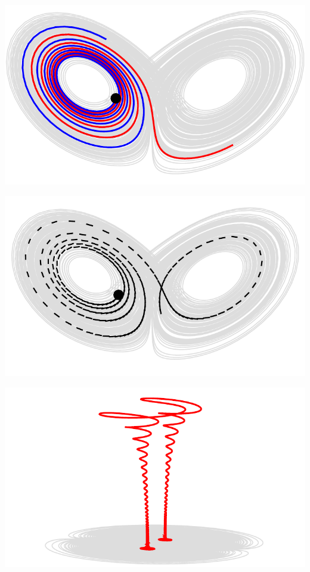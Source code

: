 \topline
\begin{center}
  \includegraphics[width=\textwidth]{i/lor.pdf}
\end{center}
\eframe

\topline
\begin{center}
  \includegraphics[width=\textwidth]{i/wolf.pdf}
\end{center}
\eframe

\topline
\begin{center}
  \includegraphics[width=\textwidth]{i/far.pdf}
\end{center}
\eframe


